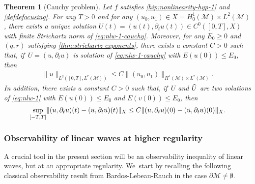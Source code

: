 \documentclass[10pt]{amsart}
\newtheorem{theorem}{Theorem}[section]
\theoremstyle{definition}
\let\mc\mathcal
\newcommand{\M}{\mc{M}}
\providecommand{\norm}[1]{\lVert#1\rVert}
\begin{document}
\begin{theorem}[Cauchy problem]\label{thm:cauchy-problem}
Let $f$ satisfies \eqref{hip:nonlinearity-hyp-1} and \eqref{defdefocusing}. For any $T>0$ and for any $(u_0, u_1)\in X=H_0^1(\M)\times L^2(\M)$, there exists a unique solution $U(t)=(u(t), \partial_t u(t))\in C^0([0, T], X)$ with finite Strichartz norm of \eqref{eq:nlw-1-cauchy}. Moreover, for any $E_0\geq 0$ and $(q, r)$ satisfying \eqref{thm:strichartz-exponents}, there exists a constant $C>0$ such that, if~$U=(u, \partial_t u)$ is solution of \eqref{eq:nlw-1-cauchy} with $E(u(0))\leq E_0$, then
\begin{align*}
\norm{u}_{L^q([0, T], L^r(\M))}\leq C\norm{(u_0, u_1)}_{H^1(\M)\times L^2(\M)}.
\end{align*}
In addition, there exists a constant $C>0$ such that, if~$U$ and $\Tilde{U}$ are two solutions of \eqref{eq:nlw-1} with $E(u(0))\leq E_0$ and $E(v(0))\leq E_0$, then
\begin{align*}
\sup_{[-T, T]}\norm{(u, \partial_t u)(t)-(\Tilde{u}, \partial_t \Tilde{u})(t)}_X\leq C\norm{(u, \partial_t u)(0)-(\Tilde{u}, \partial_t \Tilde{u})(0)}_X.
\end{align*}
\end{theorem}

\subsubsection{Observability of linear waves at higher regularity} A crucial tool in the present section will be an observability inequality of linear waves, but at an appropriate regularity. We~start by recalling the following classical observability result from Bardos-Lebeau-Rauch \cite{BLR:88} in the case $\partial\M\neq\emptyset$.
\end{document}
